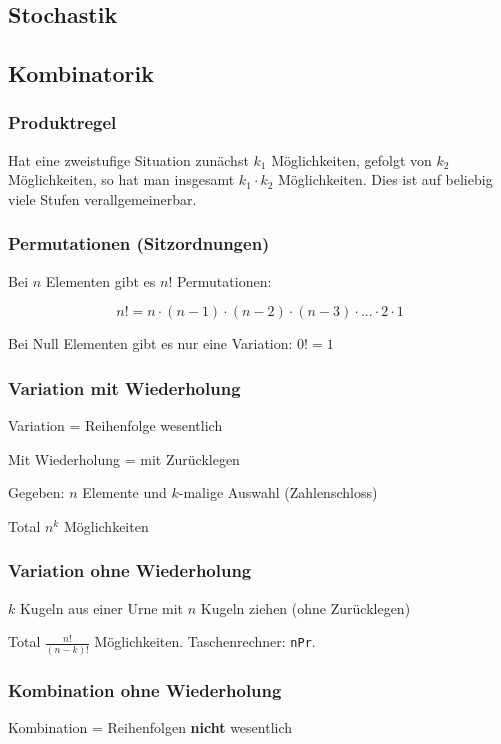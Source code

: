 \begin{multicols}{2}
\section{Stochastik}

\subsection{Kombinatorik}

\subsubsection{Produktregel}
Hat eine zweistufige Situation zunächst $k_1$ Möglichkeiten, gefolgt
von $k_2$ Möglichkeiten, so hat man insgesamt $k_1\cdot{}k_2$
Möglichkeiten. Dies ist auf beliebig viele Stufen verallgemeinerbar.

\subsubsection{Permutationen (Sitzordnungen)}

Bei $n$ Elementen gibt es $n!$ Permutationen:

$$n! = n\cdot{}(n-1)\cdot{}(n-2)\cdot{}(n-3)\cdot{} ... \cdot{}2\cdot{}1$$

Bei Null Elementen gibt es nur eine Variation: $0! = 1$


\subsubsection{Variation mit Wiederholung}
Variation = Reihenfolge wesentlich

Mit Wiederholung = mit Zurücklegen

Gegeben: $n$ Elemente und $k$-malige Auswahl
(\zB Zahlenschloss)

Total $n^k$ Möglichkeiten

\subsubsection{Variation ohne Wiederholung}
$k$ Kugeln aus einer Urne mit $n$ Kugeln ziehen (ohne Zurücklegen)

Total $\frac{n!}{(n-k)!}$ Möglichkeiten. Taschenrechner: \texttt{nPr}. 

\subsubsection{Kombination ohne Wiederholung}
Kombination = Reihenfolgen \textbf{nicht} wesentlich


\end{multicols}
